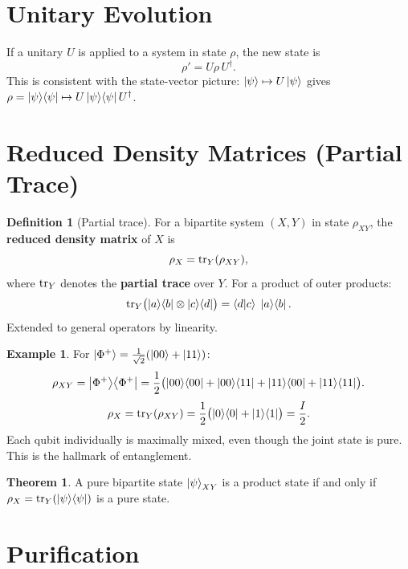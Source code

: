 \documentclass[11pt]{article}
\theoremstyle{definition}
\newtheorem{definition}{Definition}[section]
\newtheorem{example}{Example}[section]
\newtheorem{theorem}{Theorem}[section]
\begin{document}
\section{Unitary Evolution}

If a unitary $U$ is applied to a system in state $\rho$, the new state is
\[
    \rho' = U\rho\,U^\dagger.
\]
This is consistent with the state-vector picture: $\ket{\psi}\mapsto U\ket{\psi}$ gives $\rho=\ket{\psi}\!\bra{\psi}\mapsto U\ket{\psi}\!\bra{\psi}U^\dagger$.

\section{Reduced Density Matrices (Partial Trace)}

\begin{definition}[Partial trace]
For a bipartite system $(X,Y)$ in state $\rho_{XY}$, the \textbf{reduced density matrix} of $X$ is
\[
    \rho_X = \tr_Y(\rho_{XY}),
\]
where $\tr_Y$ denotes the \textbf{partial trace} over $Y$.  For a product of outer products:
\[
    \tr_Y\bigl(\ket{a}\!\bra{b}\otimes\ket{c}\!\bra{d}\bigr)
    = \braket{d}{c}\;\ket{a}\!\bra{b}.
\]
Extended to general operators by linearity.
\end{definition}

\begin{example}
For $\ket{\Phi^+}=\frac{1}{\sqrt{2}}(\ket{00}+\ket{11})$:
\[
    \rho_{XY}=\ket{\Phi^+}\!\bra{\Phi^+}
    =\frac{1}{2}\bigl(\ket{00}\!\bra{00}+\ket{00}\!\bra{11}+\ket{11}\!\bra{00}+\ket{11}\!\bra{11}\bigr).
\]
\[
    \rho_X = \tr_Y(\rho_{XY}) = \frac{1}{2}\bigl(\ket{0}\!\bra{0}+\ket{1}\!\bra{1}\bigr) = \frac{I}{2}.
\]
Each qubit individually is maximally mixed, even though the joint state is pure.  This is the hallmark of entanglement.
\end{example}

\begin{theorem}
A pure bipartite state $\ket{\psi}_{XY}$ is a product state if and only if $\rho_X=\tr_Y(\ket{\psi}\!\bra{\psi})$ is a pure state.
\end{theorem}

\section{Purification}
\end{document}
